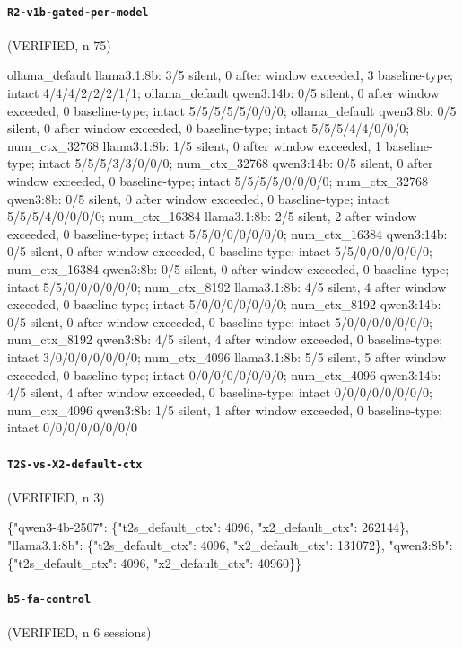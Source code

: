 \paragraph{\texttt{R2-v1b-gated-per-model}} (VERIFIED, n 75)

{\footnotesize\raggedright ollama\_default llama3.1:8b: 3/5 silent, 0 after window exceeded, 3 baseline-type; intact 4/4/4/2/2/2/1/1; ollama\_default qwen3:14b: 0/5 silent, 0 after window exceeded, 0 baseline-type; intact 5/5/5/5/5/0/0/0; ollama\_default qwen3:8b: 0/5 silent, 0 after window exceeded, 0 baseline-type; intact 5/5/5/4/4/0/0/0; num\_ctx\_32768 llama3.1:8b: 1/5 silent, 0 after window exceeded, 1 baseline-type; intact 5/5/5/3/3/0/0/0; num\_ctx\_32768 qwen3:14b: 0/5 silent, 0 after window exceeded, 0 baseline-type; intact 5/5/5/5/0/0/0/0; num\_ctx\_32768 qwen3:8b: 0/5 silent, 0 after window exceeded, 0 baseline-type; intact 5/5/5/4/0/0/0/0; num\_ctx\_16384 llama3.1:8b: 2/5 silent, 2 after window exceeded, 0 baseline-type; intact 5/5/0/0/0/0/0/0; num\_ctx\_16384 qwen3:14b: 0/5 silent, 0 after window exceeded, 0 baseline-type; intact 5/5/0/0/0/0/0/0; num\_ctx\_16384 qwen3:8b: 0/5 silent, 0 after window exceeded, 0 baseline-type; intact 5/5/0/0/0/0/0/0; num\_ctx\_8192 llama3.1:8b: 4/5 silent, 4 after window exceeded, 0 baseline-type; intact 5/0/0/0/0/0/0/0; num\_ctx\_8192 qwen3:14b: 0/5 silent, 0 after window exceeded, 0 baseline-type; intact 5/0/0/0/0/0/0/0; num\_ctx\_8192 qwen3:8b: 4/5 silent, 4 after window exceeded, 0 baseline-type; intact 3/0/0/0/0/0/0/0; num\_ctx\_4096 llama3.1:8b: 5/5 silent, 5 after window exceeded, 0 baseline-type; intact 0/0/0/0/0/0/0/0; num\_ctx\_4096 qwen3:14b: 4/5 silent, 4 after window exceeded, 0 baseline-type; intact 0/0/0/0/0/0/0/0; num\_ctx\_4096 qwen3:8b: 1/5 silent, 1 after window exceeded, 0 baseline-type; intact 0/0/0/0/0/0/0/0\par}

\paragraph{\texttt{T2S-vs-X2-default-ctx}} (VERIFIED, n 3)

{\footnotesize\raggedright \{"qwen3-4b-2507": \{"t2s\_default\_ctx": 4096, "x2\_default\_ctx": 262144\}, "llama3.1:8b": \{"t2s\_default\_ctx": 4096, "x2\_default\_ctx": 131072\}, "qwen3:8b": \{"t2s\_default\_ctx": 4096, "x2\_default\_ctx": 40960\}\}\par}

\paragraph{\texttt{b5-fa-control}} (VERIFIED, n 6 sessions)

